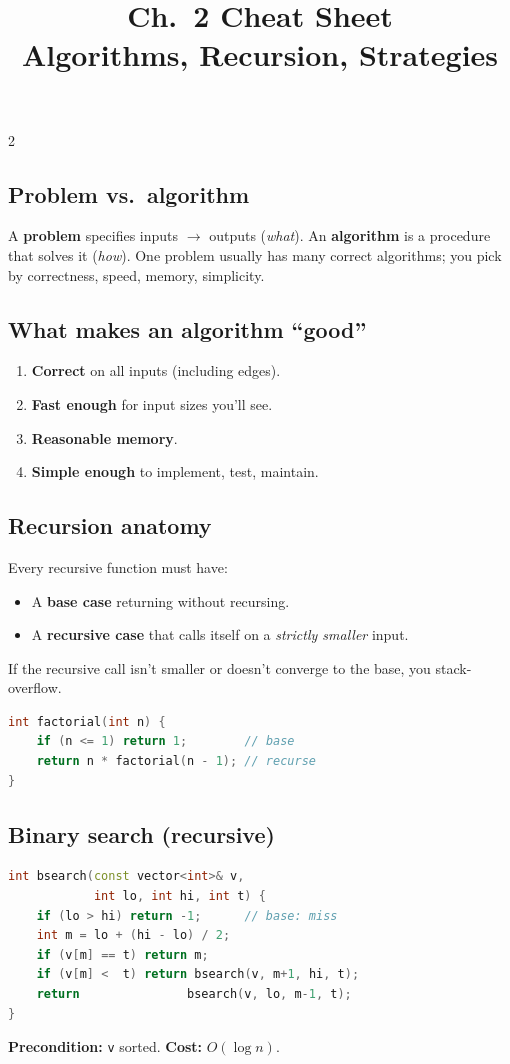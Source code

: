\documentclass[10pt]{article}
\title{Ch.~2 Cheat Sheet\\\large Algorithms, Recursion, Strategies}
\author{}
\date{}
\begin{document}
\maketitle
\vspace{-2em}

\begin{multicols}{2}

\subsection*{Problem vs.\ algorithm}
A \textbf{problem} specifies inputs $\to$ outputs (\emph{what}). An
\textbf{algorithm} is a procedure that solves it (\emph{how}). One problem
usually has many correct algorithms; you pick by correctness, speed,
memory, simplicity.

\subsection*{What makes an algorithm ``good''}
\begin{enumerate}
    \item \textbf{Correct} on all inputs (including edges).
    \item \textbf{Fast enough} for input sizes you'll see.
    \item \textbf{Reasonable memory}.
    \item \textbf{Simple enough} to implement, test, maintain.
\end{enumerate}

\subsection*{Recursion anatomy}
Every recursive function must have:
\begin{itemize}
    \item A \textbf{base case} returning without recursing.
    \item A \textbf{recursive case} that calls itself on a
    \emph{strictly smaller} input.
\end{itemize}
If the recursive call isn't smaller or doesn't converge to the base, you
stack-overflow.

\begin{lstlisting}[language=C++]
int factorial(int n) {
    if (n <= 1) return 1;        // base
    return n * factorial(n - 1); // recurse
}
\end{lstlisting}

\subsection*{Binary search (recursive)}
\begin{lstlisting}[language=C++]
int bsearch(const vector<int>& v,
            int lo, int hi, int t) {
    if (lo > hi) return -1;      // base: miss
    int m = lo + (hi - lo) / 2;
    if (v[m] == t) return m;
    if (v[m] <  t) return bsearch(v, m+1, hi, t);
    return               bsearch(v, lo, m-1, t);
}
\end{lstlisting}
\textbf{Precondition:} \texttt{v} sorted. \textbf{Cost:} $O(\log n)$.


\end{multicols}
\end{document}
